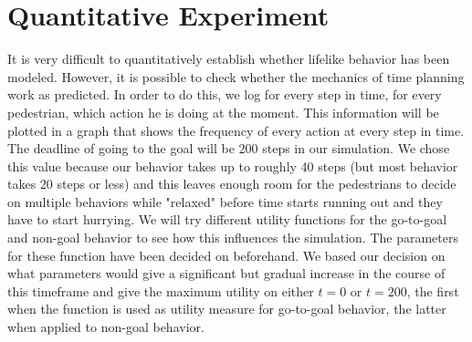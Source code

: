 \documentclass[11pt]{book}
\begin{document}




\section{Quantitative Experiment}
It is very difficult to quantitatively establish whether lifelike behavior has been modeled. However, it is possible to check whether the mechanics of time planning work as predicted. In order to do this, we log for every step in time, for every pedestrian, which action he is doing at the moment. This information will be plotted in a graph that shows the frequency of every action at every step in time. The deadline of going to the goal will be 200 steps in our simulation. We chose this value because our behavior takes up to roughly 40 steps (but most behavior takes 20 steps or less) and this leaves enough room for the pedestrians to decide on multiple behaviors while "relaxed" before time starts running out and they have to start hurrying.
We will try different utility functions for the go-to-goal and non-goal behavior to see how this influences the simulation. The parameters for these function have been decided on beforehand. We based our decision on what parameters would give a significant but gradual increase in the course of this timeframe and give the maximum utility on either $t=0$ or $t=200$, the first when the function is used as utility measure for go-to-goal behavior, the latter when applied to non-goal behavior.
\end{document}
